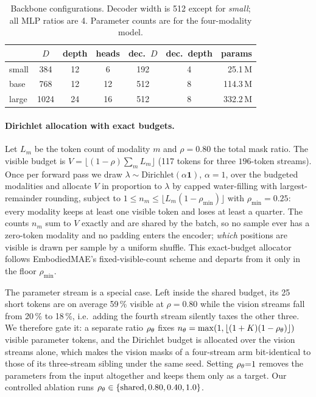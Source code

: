 \begin{table}[t]
\centering\small
\caption{Backbone configurations. Decoder width is 512 except for \emph{small};
all MLP ratios are 4. Parameter counts are for the four-modality model.}
\label{tab:sizes}
\begin{tabular}{lcccccr}
\toprule
 & $D$ & depth & heads & dec.\ $D$ & dec.\ depth & params \\
\midrule
small & 384 & 12 & 6  & 192 & 4 & 25.1\,M \\
base  & 768 & 12 & 12 & 512 & 8 & 114.3\,M \\
large & 1024 & 24 & 16 & 512 & 8 & 332.2\,M \\
\bottomrule
\end{tabular}
\end{table}

\paragraph{Dirichlet allocation with exact budgets.}
Let $L_m$ be the token count of modality $m$ and $\rho{=}0.80$ the total mask
ratio. The visible budget is $V=\lfloor(1-\rho)\sum_m L_m\rfloor$ (117 tokens for
three $196$-token streams). Once per forward pass we draw
$\lambda\sim\mathrm{Dirichlet}(\alpha\mathbf{1})$, $\alpha{=}1$, over the budgeted
modalities and allocate $V$ in proportion to $\lambda$ by capped water-filling with
largest-remainder rounding, subject to $1\le n_m\le\lfloor L_m(1-\rho_{\min})\rfloor$
with $\rho_{\min}{=}0.25$: every modality keeps at least one visible token and loses
at least a quarter. The counts $n_m$ sum to $V$ exactly and are shared by the
batch, so no sample ever has a zero-token modality and no padding enters the
encoder; \emph{which} positions are visible is drawn per sample by a uniform
shuffle. This exact-budget allocator follows EmbodiedMAE's fixed-visible-count
scheme  and departs from it only in the floor $\rho_{\min}$.

The parameter stream is a special case. Left inside the shared budget, its 25
short tokens are on average 59\,\% visible at $\rho{=}0.80$ while the vision
streams fall from 20\,\% to 18\,\%, i.e.\ adding the fourth stream silently taxes
the other three. We therefore gate it: a separate ratio $\rho_\theta$ fixes
$n_\theta=\max(1,\lfloor(1+K)(1-\rho_\theta)\rfloor)$ visible parameter tokens, and the
Dirichlet budget is allocated over the vision streams alone, which makes the
vision masks of a four-stream arm bit-identical to those of its three-stream
sibling under the same seed. Setting $\rho_\theta{=}1$ removes the parameters from
the input altogether and keeps them only as a target. Our controlled ablation runs
$\rho_\theta\in\{\text{shared},0.80,0.40,1.0\}$.

